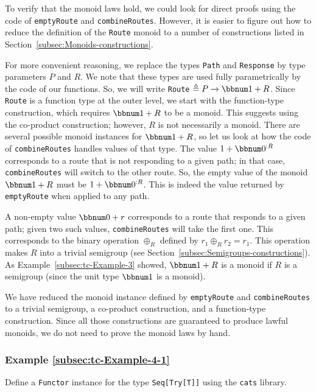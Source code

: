 To verify that the monoid laws hold, we could look for direct proofs
using the code of \lstinline!emptyRoute! and \lstinline!combineRoutes!.
However, it is easier to figure out how to reduce the definition of
the \lstinline!Route! monoid to a number of constructions listed
in Section~\ref{subsec:Monoids-constructions}. 

For more convenient reasoning, we replace the types \lstinline!Path!
and \lstinline!Response! by type parameters $P$ and $R$. We note
that these types are used fully parametrically by the code of our
functions. So, we will write \lstinline!Route! $\triangleq P\rightarrow\bbnum 1+R$.
Since \lstinline!Route! is a function type at the outer level, we
start with the function-type construction, which requires $\bbnum 1+R$
to be a monoid. This suggests using the co-product construction; however,
$R$ is not necessarily a monoid. There are several possible monoid
instances for $\bbnum 1+R$, so let us look at how the code of \lstinline!combineRoutes!
handles values of that type. The value $1+\bbnum 0^{:R}$ corresponds
to a route that is not responding to a given path; in that case, \lstinline!combineRoutes!
will switch to the other route. So, the empty value of the monoid
$\bbnum 1+R$ must be $1+\bbnum 0^{:R}$. This is indeed the value
returned by \lstinline!emptyRoute! when applied to any path.

A non-empty value $\bbnum 0+r$ corresponds to a route that responds
to a given path; given two such values, \lstinline!combineRoutes!
will take the first one. This corresponds to the binary operation
$\oplus_{R}$ defined by $r_{1}\oplus_{R}r_{2}=r_{1}$. This operation
makes $R$ into a trivial semigroup (see Section~\ref{subsec:Semigroups-constructions}).
As Example~\ref{subsec:tc-Example-3} showed, $\bbnum 1+R$ is a
monoid if $R$ is a semigroup (since the unit type $\bbnum 1$ is
a monoid).

We have reduced the monoid instance defined by \lstinline!emptyRoute!
and \lstinline!combineRoutes! to a trivial semigroup, a co-product
construction, and a function-type construction. Since all those constructions
are guaranteed to produce lawful monoids, we do not need to prove
the monoid laws by hand.

\subsubsection{Example \label{subsec:tc-Example-4-1}\ref{subsec:tc-Example-4-1}}

Define a \lstinline!Functor! instance for the type \lstinline!Seq[Try[T]]!
using the \texttt{cats} library.


